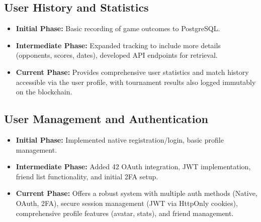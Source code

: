 \subsection*{User History and Statistics}
\begin{itemize}
    \item \textbf{Initial Phase:} Basic recording of game outcomes to PostgreSQL.
    \item \textbf{Intermediate Phase:} Expanded tracking to include more details (opponents, scores, dates), developed API endpoints for retrieval.
    \item \textbf{Current Phase:} Provides comprehensive user statistics and match history accessible via the user profile, with tournament results also logged immutably on the blockchain.
\end{itemize}

\subsection*{User Management and Authentication}
\begin{itemize}
    \item \textbf{Initial Phase:} Implemented native registration/login, basic profile management.
    \item \textbf{Intermediate Phase:} Added 42 OAuth integration, JWT implementation, friend list functionality, and initial 2FA setup.
    \item \textbf{Current Phase:} Offers a robust system with multiple auth methods (Native, OAuth, 2FA), secure session management (JWT via HttpOnly cookies), comprehensive profile features (avatar, stats), and friend management.
\end{itemize}